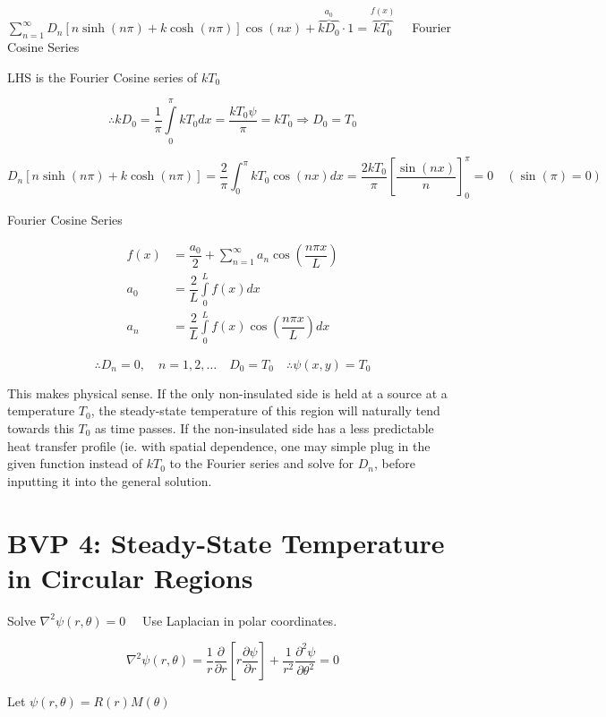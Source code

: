 \documentclass{report}
\begin{document}
$\sum\limits_{n=1}^{\infty} D_{n}[n \sinh (n \pi)+k \cosh (n \pi)] \cos (n x)+\overbrace{k D_{0}}^{a_0} \cdot 1=\overbrace{k T_{0}}^{f(x)} \quad$ Fourier Cosine Series

LHS is the Fourier Cosine series of $k T_{0}$

$$
\therefore k D_{0}=\dfrac{1}{\pi} \displaystyle\int\limits_{0}^{\pi} k T_{0} d x=\dfrac{k T_{0} \psi}{\pi}=k T_{0} \Rightarrow D_{0}=T_{0}
$$

$$
D_{n}[n \sinh (n \pi)+k \cosh (n \pi)]=\dfrac{2}{\pi} \displaystyle\int_{0}^{\pi} k T_{0} \cos (n x) d x =\dfrac{2 k T_{0}}{\pi}\left[\dfrac{\sin (n x)}{n}\right]_{0}^{\pi}=0 \quad(\sin (\pi)=0)
$$

Fourier Cosine Series

$$
\begin{aligned}
f(x) & = \dfrac{a_{0}}{2}+\sum\limits_{n=1}^{\infty} a_{n} \cos \left(\dfrac{n \pi x}{L}\right) \\
a_{0} & =\dfrac{2}{L} \displaystyle\int\limits_{0}^{L} f(x) d x \\
a_{n} & =\dfrac{2}{L} \displaystyle\int\limits_{0}^{L} f(x) \cos \left(\dfrac{n \pi x}{L}\right) d x
\end{aligned}
$$

$$
\therefore D_{n}=0,\quad n=1,2, \ldots \quad D_{0}=T_{0} \quad \therefore \psi(x, y)=T_{0}
$$

This makes physical sense. If the only non-insulated side is held at a source at a temperature $T_{0}$, the steady-state temperature of this region will naturally tend towards this $T_{0}$ as time passes. If the non-insulated side has a less predictable heat transfer profile (ie. with spatial dependence, one may simple plug in the given function instead of $kT_{0}$ to the Fourier series and solve for $D_{n}$, before inputting it into the general solution. 

\section{BVP 4: Steady-State Temperature in Circular Regions}

Solve $\nabla^{2} \psi(r, \theta)=0 \quad$ Use Laplacian in polar coordinates.

$$
\nabla^{2} \psi(r, \theta)=\dfrac{1}{r} \dfrac{\partial}{\partial r}\left[r \dfrac{\partial \psi}{\partial r}\right]+\dfrac{1}{r^{2}} \dfrac{\partial^{2} \psi}{\partial \theta^{2}}=0
$$

Let $\psi(r, \theta)=R(r) M(\theta)$
\end{document}
